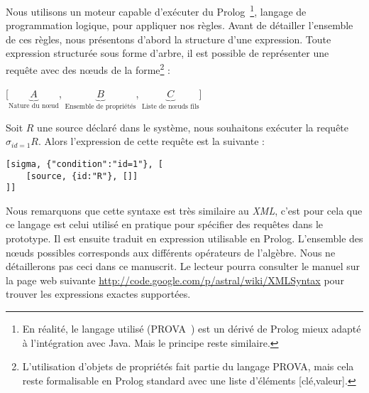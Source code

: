 Nous utilisons un moteur capable d'exécuter du Prolog~\footnote{En réalité, le langage utilisé (PROVA~\cite{Kozlenkov:prova}) est un dérivé de Prolog mieux adapté à l'intégration avec Java. Mais le principe reste similaire.}, langage de programmation logique, pour appliquer nos règles. Avant de détailler l'ensemble de ces règles, nous présentons d'abord la structure d'une expression. Toute expression structurée sous forme d'arbre, il est possible de représenter une requête avec des nœuds de la forme\footnote{L'utilisation d'objets de propriétés fait partie du langage PROVA, mais cela reste formalisable en Prolog standard avec une liste d'éléments [clé,valeur].} :
\begin{center} [$\underbrace{A}_{\textrm{Nature du nœud}}$, $\underbrace{B}_{\textrm{Ensemble de propriétés}}$, $\underbrace{C}_{\textrm{Liste de nœuds fils}}$] \end{center}
\begin{example}
	Soit $R$ une source déclaré dans le système, nous souhaitons exécuter la requête $\sigma_{id=1} R$. Alors l'expression de cette requête est la suivante :
	\begin{lstlisting}
[sigma,	{"condition":"id=1"}, [
	[source, {id:"R"}, []]
]]
	\end{lstlisting}
\end{example}
Nous remarquons que cette syntaxe est très similaire au \textit{XML}, c'est pour cela que ce langage est celui utilisé en pratique pour spécifier des requêtes dans le prototype. Il est ensuite traduit en expression utilisable en Prolog. L'ensemble des nœuds possibles corresponds aux différents opérateurs de l'algèbre. Nous ne détaillerons pas ceci dans ce manuscrit. Le lecteur pourra consulter le manuel sur la page web suivante \url{http://code.google.com/p/astral/wiki/XMLSyntax} pour trouver les expressions exactes supportées.